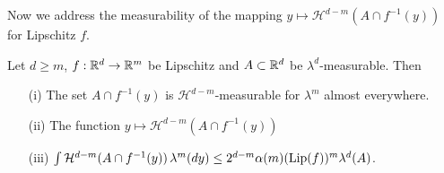 Now we address the measurability of the mapping $y \mapsto \mathcal{H}^{d-m} (A \cap f^{-1}(y))$ for Lipschitz $f$.
\begin{lem}\label{CoareaFormulaMeasurability}Let $d \geq m$, $f : \mathbb{R}^d \to \mathbb{R}^m$ be Lipschitz
  and $A \subset \mathbb{R}^d$ be $\lambda^d$-measurable.  Then
\begin{itemize}
\item[(i)] The set $A \cap f^{-1}(y)$ is $\mathcal{H}^{d-m}$-measurable for $\lambda^m$ almost everywhere.
\item[(ii)] The function $y \mapsto \mathcal{H}^{d-m} (A \cap f^{-1}(y))$
\item[(iii)] $\int \mathcal{H}^{d-m} (A \cap f^{-1}(y)) \, \lambda^m(dy) \leq 2^{d-m} \alpha(m) (\operatorname*{Lip}(f))^m \lambda^d(A)$.
\end{itemize}
\end{lem}
